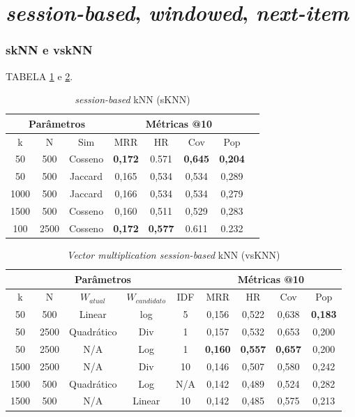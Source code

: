 \newpage


\section{\textit{session-based}, \textit{windowed}, \textit{next-item}}
\subsubsection{skNN e vskNN}
TABELA \ref{app:sknn2} e \ref{app:vsknn2}.
\begin{table}[htbp]
    \centering
    \begin{tabular}{|c|c|c|c|c|c|c|c|}
      \hline
      \multicolumn{3}{|c|}{Parâmetros} & \multicolumn{4}{c|}{Métricas @10} \\
      \hline
      k & N & Sim & MRR & HR & Cov & Pop\\
      \hline
      50 & 500 & Cosseno & \textbf{0,172} & 0.571 & \textbf{0,645} & \textbf{0,204} \\
      \hline
      50 & 500 & Jaccard & 0,165 & 0,534 & 0,534 & 0,289 \\
      \hline
      1000 & 500 & Jaccard & 0,166 & 0,534 & 0,534 & 0,279 \\
      \hline
      1500 & 500 & Cosseno & 0,160 & 0,511 & 0,529 & 0,283 \\
      \hline
      100 & 2500 & Cosseno & \textbf{0,172} & \textbf{0,577} & 0.611 & 0.232 \\
      \hline
    \end{tabular}
    \caption{\textit{session-based} kNN (sKNN)}
    \label{app:sknn2}
  \end{table}


\begin{table}[htbp]
\centering
  \begin{tabular}{|c|c|c|c|c|c|c|c|c|}
    \hline
    \multicolumn{5}{|c|}{Parâmetros} & \multicolumn{4}{c|}{Métricas @10} \\
    \hline
    k & N & $W_{atual}$ & $W_{candidato}$ & IDF & MRR & HR & Cov & Pop \\
    \hline
    50 & 500 & Linear & log & 5 & 0,156 & 0,522  & 0,638 & \textbf{0,183} \\
    \hline
    50 & 2500 & Quadrático & Div & 1 & 0,157 & 0,532 & 0,653 & 0,200 \\
    \hline
    50 & 2500 & N/A & Log & 1 & \textbf{0,160} & \textbf{0,557} & \textbf{0,657} & 0,200 \\
    \hline
    1500 & 2500 & N/A & Div & 10 & 0,146 & 0,507 & 0,580 & 0,242 \\
    \hline
    1500 & 500 & Quadrático & Log & N/A & 0,142 & 0,489 & 0,524 & 0,282 \\
    \hline
    1500 & 500 & N/A & Linear & 10 & 0,142 & 0,485 & 0,575 & 0,213 \\
    \hline
  \end{tabular}
  \caption{\textit{Vector multiplication session-based} kNN (vsKNN)}
  \label{app:vsknn2}
\end{table}

